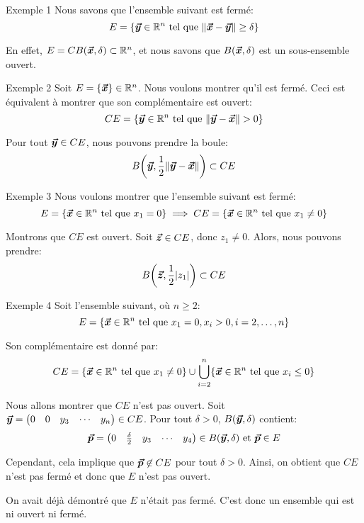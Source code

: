 \documentclass[a4paper]{article}
\begin{document}
\begin{parag}{Exemple 1}
    Nous savons que l'ensemble suivant est fermé:
    \[E = \left\{\bvec{y} \in \mathbb{R}^n \telque \left\|\bvec{x} - \bvec{y}\right\| \geq \delta\right\}\]

    En effet, $E = CB\left(\bvec{x}, \delta\right) \subset \mathbb{R}^n$, et nous savons que $B\left(\bvec{x}, \delta\right)$ est un sous-ensemble ouvert.
\end{parag}

\begin{parag}{Exemple 2}
    Soit $E = \left\{\bvec{x}\right\} \in \mathbb{R}^n$. Nous voulons montrer qu'il est fermé. Ceci est équivalent à montrer que son complémentaire est ouvert: 
    \[CE = \left\{\bvec{y} \in \mathbb{R}^n \telque\left\|\bvec{y} - \bvec{x}\right\| > 0\right\}\]
    
    Pour tout $\bm{\protect\vec{y}} \in CE$, nous pouvons prendre la boule: 
    \[B\left(\bvec{y}, \frac{1}{2} \left\|\bvec{y} - \bvec{x}\right\|\right) \subset CE\]
\end{parag}

\begin{parag}{Exemple 3}
    Nous voulons montrer que l'ensemble suivant est fermé: 
    \[E = \left\{\bvec{x} \in\mathbb{R}^n \telque x_1 = 0\right\} \implies CE = \left\{\bvec{x} \in \mathbb{R}^n \telque x_1 \neq 0\right\}\]
    
    Montrons que $CE$ est ouvert. Soit $\bm{\protect\vec{z}} \in CE$, donc $z_1 \neq 0$. Alors, nous pouvons prendre: 
    \[B\left(\bvec{z}, \frac{1}{2} \left|z_1\right|\right) \subset CE\]
\end{parag}

\begin{parag}{Exemple 4}
    Soit l'ensemble suivant, où $n \geq 2$: 
    \[E = \left\{\bvec{x} \in \mathbb{R}^n \telque x_1 = 0, x_i > 0,  i = 2, \ldots, n\right\}\]

    Son complémentaire est donné par: 
    \[CE = \left\{\bvec{x} \in \mathbb{R}^n \telque x_1 \neq0\right\} \cup \bigcup_{i=2}^n \left\{\bvec{x} \in \mathbb{R}^n \telque x_i \leq 0\right\}\]
    
    Nous allons montrer que $CE$ n'est pas ouvert. Soit $\bm{\protect\vec{y}} = \begin{pmatrix} 0 & 0 & y_3 & \cdots & y_n \end{pmatrix} \in CE$. Pour tout $\delta > 0$, $B\left(\bvec{y}, \delta\right)$ contient: 
    \[\bvec{p} = \begin{pmatrix} 0 & \frac{\delta}{2} & y_3 & \cdots & y_4 \end{pmatrix} \in B\left(\bvec{y}, \delta\right) \text{ et } \bvec{p}\in E\]
    
    Cependant, cela implique que $\bm{\protect\vec{p}} \not\in CE$ pour tout $\delta > 0$. Ainsi, on obtient que $CE$ n'est pas fermé et donc que $E$ n'est pas ouvert.

    On avait déjà démontré que $E$ n'était pas fermé. C'est donc un ensemble qui est ni ouvert ni fermé.
\end{parag}
\end{document}
